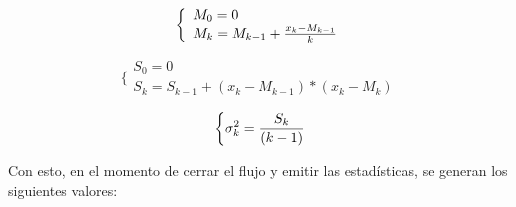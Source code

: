 \begin{equation} \label{eq:meanrec}
  \biggl\{
      \begin{array}{l}
        M_{0} = 0\\
        M_{k} = M_{k-1} + {{ x_{k} - M_{k-1} } \over {k}}  \\
      \end{array} 
\end{equation}

\begin{equation} \label{eq:sqrrec}
  \biggl\{
      \begin{array}{l}
        S_{0} = 0 \\
        S_{k} = S_{k-1} + ( x_{k} - M_{k-1} ) * ( x_{k} - M_{k} )
      \end{array}      
\end{equation}

\begin{equation} \label{eq:variancereq}
  \biggl\{
    \sigma^2_{k} = {S_{k} \over {(k - 1)}}
\end{equation}

Con esto, en el momento de cerrar el flujo y emitir las estadísticas, se generan los siguientes valores:


